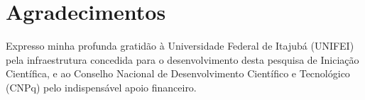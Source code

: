 \section*{Agradecimentos}

Expresso minha profunda gratidão à Universidade Federal de Itajubá (UNIFEI) pela infraestrutura concedida para o desenvolvimento desta pesquisa de Iniciação Científica, e ao Conselho Nacional de Desenvolvimento Científico e Tecnológico (CNPq) pelo indispensável apoio financeiro.
